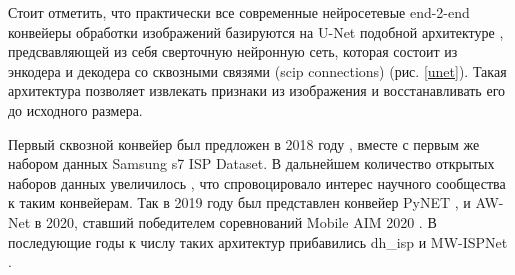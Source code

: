 
Стоит отметить, что практически все современные нейросетевые end-2-end конвейеры обработки изображений базируются на U-Net подобной архитектуре \cite{lib-u-net}, предсвавляющей из себя сверточную нейронную сеть, которая состоит из энкодера и декодера со сквозными связями (scip connections) (рис. \ref{unet}). Такая архитектура позволяет извлекать признаки из изображения и восстанавливать его до исходного размера.

Первый сквозной конвейер был предложен в 2018 году \cite{lib-deep-isp}, вместе с первым же набором данных Samsung s7 ISP Dataset. В дальнейшем количество открытых наборов данных увеличилось \cite{lib-zurich-raw-rgb}, что спровоцировало интерес научного сообщества к таким конвейерам. Так в 2019 году был представлен конвейер PyNET \cite{lib-py-net}, и AW-Net \cite{lib-aw-net} в 2020, ставший победителем соревнований Mobile AIM 2020 \cite{lib-mobile-aim-2020}. В последующие годы к числу таких архитектур прибавились dh\_isp и MW-ISPNet \cite{lib-aim21}.

